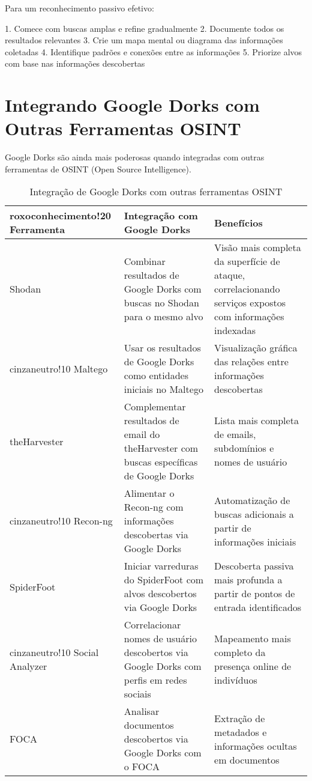\documentclass[12pt,a4paper]{book}
\begin{document}
\begin{tipbox}
Para um reconhecimento passivo efetivo:

1. Comece com buscas amplas e refine gradualmente
2. Documente todos os resultados relevantes
3. Crie um mapa mental ou diagrama das informações coletadas
4. Identifique padrões e conexões entre as informações
5. Priorize alvos com base nas informações descobertas
\end{tipbox}

\section{Integrando Google Dorks com Outras Ferramentas OSINT}

Google Dorks são ainda mais poderosas quando integradas com outras ferramentas de OSINT (Open Source Intelligence).

\begin{table}[h]
\centering
\begin{tabular}{|p{3cm}|p{5cm}|p{7cm}|}
\hline
{roxoconhecimento!20} \textbf{Ferramenta} & \textbf{Integração com Google Dorks} & \textbf{Benefícios} \\
\hline
Shodan & Combinar resultados de Google Dorks com buscas no Shodan para o mesmo alvo & Visão mais completa da superfície de ataque, correlacionando serviços expostos com informações indexadas \\
\hline
{cinzaneutro!10} Maltego & Usar os resultados de Google Dorks como entidades iniciais no Maltego & Visualização gráfica das relações entre informações descobertas \\
\hline
theHarvester & Complementar resultados de email do theHarvester com buscas específicas de Google Dorks & Lista mais completa de emails, subdomínios e nomes de usuário \\
\hline
{cinzaneutro!10} Recon-ng & Alimentar o Recon-ng com informações descobertas via Google Dorks & Automatização de buscas adicionais a partir de informações iniciais \\
\hline
SpiderFoot & Iniciar varreduras do SpiderFoot com alvos descobertos via Google Dorks & Descoberta passiva mais profunda a partir de pontos de entrada identificados \\
\hline
{cinzaneutro!10} Social Analyzer & Correlacionar nomes de usuário descobertos via Google Dorks com perfis em redes sociais & Mapeamento mais completo da presença online de indivíduos \\
\hline
FOCA & Analisar documentos descobertos via Google Dorks com o FOCA & Extração de metadados e informações ocultas em documentos \\
\hline
\end{tabular}
\caption{Integração de Google Dorks com outras ferramentas OSINT}
\end{table}
\end{document}
